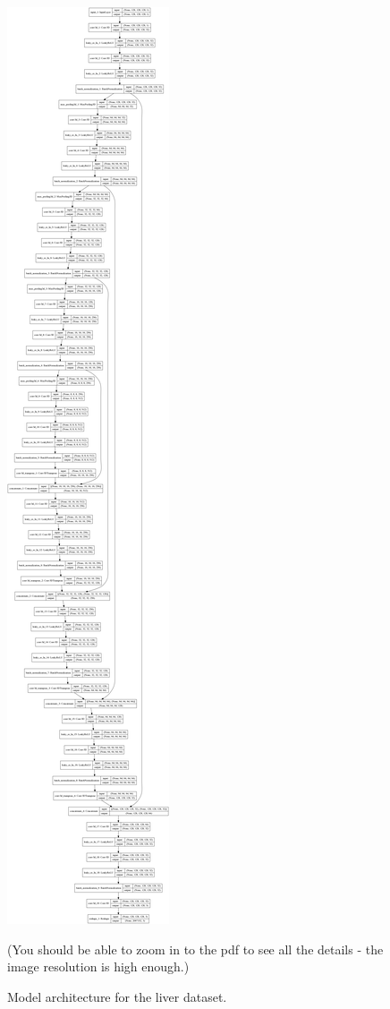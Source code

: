 \documentclass{article}
\begin{document}
		\begin{figure}[htbp]
			\centering
			\includegraphics[height=\textheight]{model.png}
			\caption{Model architecture for the liver dataset.}
			(You should be able to zoom in to the pdf to see all the details - the image resolution is high enough.)
			\label{fig:model}
		\end{figure}
\end{document}
